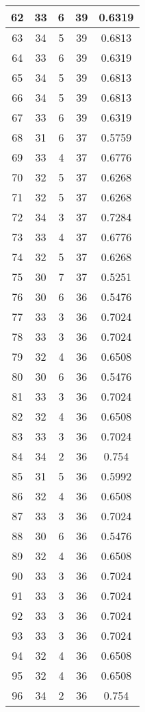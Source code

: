 \documentclass[letterpaper, 12pt]{article}
\begin{document}
\begin{longtable}{|c|c|c|c|c|}
\hline
62 & 33 & 6 & 39 & 0.6319 \\
\hline
63 & 34 & 5 & 39 & 0.6813 \\
\hline
64 & 33 & 6 & 39 & 0.6319 \\
\hline
65 & 34 & 5 & 39 & 0.6813 \\
\hline
66 & 34 & 5 & 39 & 0.6813 \\
\hline
67 & 33 & 6 & 39 & 0.6319 \\
\hline
68 & 31 & 6 & 37 & 0.5759 \\
\hline
69 & 33 & 4 & 37 & 0.6776 \\
\hline
70 & 32 & 5 & 37 & 0.6268 \\
\hline
71 & 32 & 5 & 37 & 0.6268 \\
\hline
72 & 34 & 3 & 37 & 0.7284 \\
\hline
73 & 33 & 4 & 37 & 0.6776 \\
\hline
74 & 32 & 5 & 37 & 0.6268 \\
\hline
75 & 30 & 7 & 37 & 0.5251 \\
\hline
76 & 30 & 6 & 36 & 0.5476 \\
\hline
77 & 33 & 3 & 36 & 0.7024 \\
\hline
78 & 33 & 3 & 36 & 0.7024 \\
\hline
79 & 32 & 4 & 36 & 0.6508 \\
\hline
80 & 30 & 6 & 36 & 0.5476 \\
\hline
81 & 33 & 3 & 36 & 0.7024 \\
\hline
82 & 32 & 4 & 36 & 0.6508 \\
\hline
83 & 33 & 3 & 36 & 0.7024 \\
\hline
84 & 34 & 2 & 36 & 0.754 \\
\hline
85 & 31 & 5 & 36 & 0.5992 \\
\hline
86 & 32 & 4 & 36 & 0.6508 \\
\hline
87 & 33 & 3 & 36 & 0.7024 \\
\hline
88 & 30 & 6 & 36 & 0.5476 \\
\hline
89 & 32 & 4 & 36 & 0.6508 \\
\hline
90 & 33 & 3 & 36 & 0.7024 \\
\hline
91 & 33 & 3 & 36 & 0.7024 \\
\hline
92 & 33 & 3 & 36 & 0.7024 \\
\hline
93 & 33 & 3 & 36 & 0.7024 \\
\hline
94 & 32 & 4 & 36 & 0.6508 \\
\hline
95 & 32 & 4 & 36 & 0.6508 \\
\hline
96 & 34 & 2 & 36 & 0.754 \\

\end{longtable}
\end{document}
